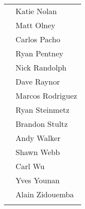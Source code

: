 \documentclass[english]{report}
\begin{document}
\begin{tabular}{p{3in} p{3in}}
& Katie Nolan\\
& Matt Olney\\
& Carlos Pacho\\
& Ryan Pentney\\
& Nick Randolph\\
& Dave Raynor\\
& Marcos Rodriguez\\
& Ryan Steinmetz\\
& Brandon Stultz\\
& Andy Walker\\
& Shawn Webb\\
& Carl Wu\\
& Yves Younan\\
& Alain Zidouemba\\ 
\\
\end{tabular}
\end{document}
